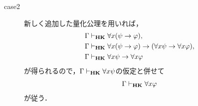 \begin{sketch}
\begin{description}
			\item[case2]
				新しく追加した量化公理を用いれば，
				\begin{align}
					\Gamma &\vdash_{{\scriptsize \mbox{{\bf HK}}}} \forall x (\psi \rightarrow \varphi), \\
					\Gamma &\vdash_{{\scriptsize \mbox{{\bf HK}}}} \forall x (\psi \rightarrow \varphi) \rightarrow (\forall x \psi \rightarrow \forall x \varphi), \\
					\Gamma &\vdash_{{\scriptsize \mbox{{\bf HK}}}} \forall x \psi \rightarrow \forall x \varphi
				\end{align}
				が得られるので，$\Gamma \vdash_{{\scriptsize \mbox{{\bf HK}}}} \forall x \psi$の仮定と併せて
				\begin{align}
					\Gamma \vdash_{{\scriptsize \mbox{{\bf HK}}}} \forall x \varphi
				\end{align}
				が従う．
				\QED
		\end{description}
	\end{sketch}
	
